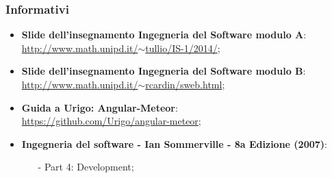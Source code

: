 \subsubsection{Informativi}
\begin{itemize}
	\item \textbf{Slide dell'insegnamento Ingegneria del Software modulo A}:\\ \href{http://www.math.unipd.it/~tullio/IS-1/2014/}{http://www.math.unipd.it/$\sim$tullio/IS-1/2014/};
	\item \textbf{Slide dell'insegnamento Ingegneria del Software modulo B}:\\ \href{http://www.math.unipd.it/~rcardin/sweb.html}{http://www.math.unipd.it/$\sim$rcardin/sweb.html};
	\item \textbf{Guida a Urigo: Angular-Meteor}: \\
\href{https://github.com/Urigo/angular-meteor}{https://github.com/Urigo/angular-meteor};
	\item \textbf{Ingegneria del software - Ian Sommerville - 8a Edizione (2007)}:
		\begin{itemize}
		\item[-] Part 4: Development;
		\end{itemize}
\end{itemize}